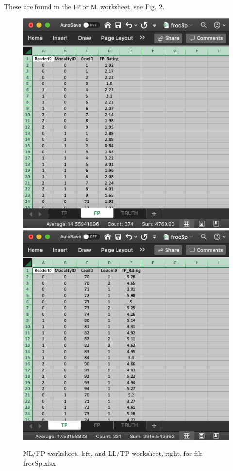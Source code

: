 \documentclass[
]{book}
\begin{document}
These are found in the \texttt{FP} or \texttt{NL} worksheet, see Fig. 2.

\begin{figure}

{\centering \includegraphics[width=0.5\linewidth,height=0.2\textheight]{images/frocSpNL} \includegraphics[width=0.5\linewidth,height=0.2\textheight]{images/frocSpLL} 

}

\caption{NL/FP worksheet, left, and LL/TP worksheet, right, for file frocSp.xlsx}\label{fig:frocSpLL}
\end{figure}
\end{document}
